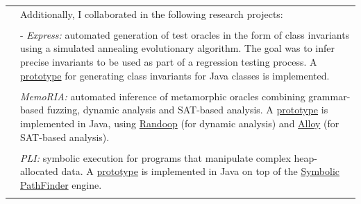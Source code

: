 \documentclass[a4paper,10pt]{article} %
\begin{document}
\begin{longtable}{>{\raggedleft\arraybackslash}p{} p{}}
& Additionally, I collaborated in the following research projects: \\ & \\
& - \textit{Express:} automated generation of test oracles in the form of class invariants using a simulated annealing evolutionary algorithm. The goal was to infer precise invariants to be used as part of a regression testing process. A \href{https://github.com/JuanmaCopia/express}{prototype} for generating class invariants for Java classes is implemented. \\ & \\
& \textit{MemoRIA:} automated inference of metamorphic oracles combining grammar-based fuzzing, dynamic analysis and SAT-based analysis. A \href{https://zenodo.org/records/10683011}{prototype} is implemented in Java, using \href{https://randoop.github.io/randoop/}{Randoop} (for dynamic analysis) and \href{https://alloytools.org/}{Alloy} (for SAT-based analysis). \\ & \\
& \textit{PLI:} symbolic execution for programs that manipulate complex heap-allocated data. A \href{https://github.com/JuanmaCopia/spf-pli}{prototype} is implemented in Java on top of the \href{https://github.com/SymbolicPathFinder/jpf-symbc}{Symbolic PathFinder} engine.
\\ & \\


\end{longtable}
\end{document}
